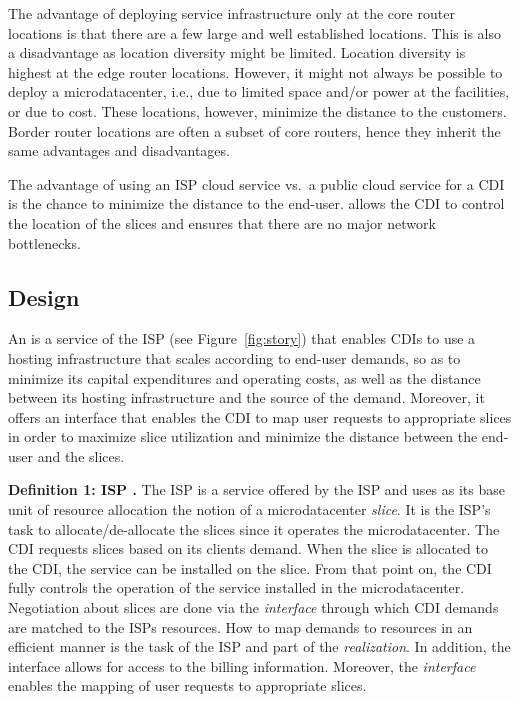 The advantage of deploying service infrastructure only at the core router
locations is that there are a few large and well established locations. This is
also a disadvantage as location diversity might be limited. Location diversity
is highest at the edge router locations.  However, it might not always be
possible to deploy a microdatacenter, i.e., due to limited space and/or power
at the facilities, or due to cost. These locations, however, minimize the
distance to the customers.  Border router locations are often a subset of core
routers, hence they inherit the same advantages and disadvantages.

The advantage of using an ISP cloud service vs.\ a public cloud
service for a CDI is the chance to minimize the distance to the
end-user. \ondemandbase allows the CDI to control the
location of the slices and ensures that there are no major network
bottlenecks.


\subsection{\OnService Design}\label{sec:service-design}

An {\it \onservice} is a service of the ISP (see Figure~\ref{fig:story}) that
enables CDIs to use a hosting infrastructure that scales according to end-user
demands, so as to minimize its capital expenditures and operating costs, as
well as the distance between its hosting infrastructure and the source of the
demand.  Moreover, it offers an interface that enables the CDI to map user
requests to appropriate slices in order to maximize slice utilization and
minimize the distance between the end-user and the slices.

{\bf Definition 1: ISP \OnService.}  The ISP \onservice is a service offered by
the ISP and uses as its base unit of resource allocation the notion of a
microdatacenter \emph{slice}.  It is the ISP's task to allocate/de-allocate the
slices since it operates the microdatacenter.  The CDI requests slices based on
its clients demand. When the slice is allocated to the CDI, the service can be
installed on the slice. From that point on, the CDI fully controls the
operation of the service installed in the microdatacenter. Negotiation about
slices are done via the \emph{\onservice interface} through which CDI demands
are matched to the ISPs resources. How to map demands to resources in an
efficient manner is the task of the ISP and part of the \emph{\onservice
realization}.  In addition, the interface allows for access to the billing
information.  Moreover, the \emph{\onservice interface} enables the mapping of
user requests to appropriate slices.

